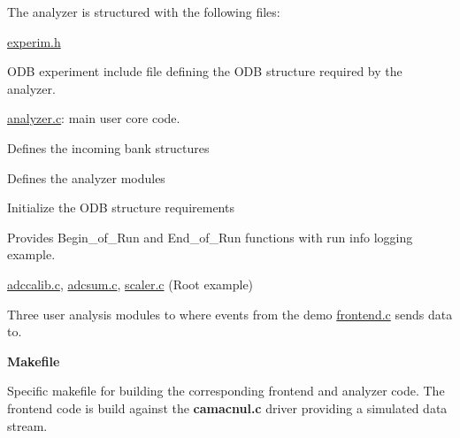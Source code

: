 \begin{DoxyItemize}
\item The analyzer is structured with the following files:
\begin{DoxyItemize}
\item \hyperlink{experim_8h}{experim.h}
\begin{DoxyItemize}
\item ODB experiment include file defining the ODB structure required by the analyzer.
\end{DoxyItemize}
\item \hyperlink{analyzer_8c}{analyzer.c}: main user core code.
\begin{DoxyItemize}
\item Defines the incoming bank structures
\item Defines the analyzer modules
\item Initialize the ODB structure requirements
\item Provides Begin\_\-of\_\-Run and End\_\-of\_\-Run functions with run info logging example.
\end{DoxyItemize}
\item \hyperlink{adccalib_8c}{adccalib.c}, \hyperlink{adcsum_8c}{adcsum.c}, \hyperlink{scaler_8c}{scaler.c} (Root example)
\begin{DoxyItemize}
\item Three user analysis modules to where events from the demo \hyperlink{frontend_8c}{frontend.c} sends data to.
\end{DoxyItemize}
\item {\bfseries Makefile} 
\begin{DoxyItemize}
\item Specific makefile for building the corresponding frontend and analyzer code. The frontend code is build against the {\bfseries camacnul.c} driver providing a simulated data stream.
\end{DoxyItemize}
\end{DoxyItemize}
\end{DoxyItemize}


